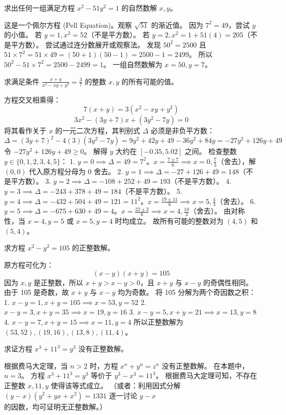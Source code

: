 \begin{questions}
\question 求出任何一组满足方程 $x^2 - 51y^2 = 1$ 的自然数解 $x, y$。
\begin{solution}
这是一个佩尔方程 (Pell Equation)。观察 $\sqrt{51}$ 的渐近值。
因为 $7^2 = 49$，尝试 $y$ 的小值。
若 $y = 1, x^2 = 52$（不是平方数）。
若 $y = 2, x^2 = 1 + 51(4) = 205$（不是平方数）。
尝试通过连分数展开或观察法。
发现 $50^2 = 2500$ 且 $51 \times 7^2 = 51 \times 49 = (50+1)(50-1) = 2500 - 1 = 2499$。
所以 $50^2 - 51 \times 7^2 = 2500 - 2499 = 1$。
一组自然数解为 $x = 50, y = 7$。
\end{solution}

\question 求满足条件 $\frac{x+y}{x^2-xy+y^2} = \frac{3}{7}$ 的整数 $x, y$ 的所有可能的值。
\begin{solution}
方程交叉相乘得：
\[7(x + y) = 3(x^2 - xy + y^2)\]
\[3x^2 - (3y + 7)x + (3y^2 - 7y) = 0\]
将其看作关于 $x$ 的一元二次方程，其判别式 $\Delta$ 必须是非负平方数：
\[\Delta = (3y + 7)^2 - 4(3)(3y^2 - 7y) = 9y^2 + 42y + 49 - 36y^2 + 84y = -27y^2 + 126y + 49\]
令 $-27y^2 + 126y + 49 \ge 0$。
解得 $y$ 大约在 $[-0.35, 5.02]$ 之间。
检查整数 $y \in \{0, 1, 2, 3, 4, 5\}$：
1. $y = 0 \implies \Delta = 49 = 7^2$。$x = \frac{7 \pm 7}{6} \implies x = 0, \frac{7}{3}$（舍去），解 $(0, 0)$ 代入原方程分母为 0 舍去。
2. $y = 1 \implies \Delta = -27 + 126 + 49 = 148$（不是平方数）。
3. $y = 2 \implies \Delta = -108 + 252 + 49 = 193$（不是平方数）。
4. $y = 3 \implies \Delta = -243 + 378 + 49 = 184$（不是平方数）。
5. $y = 4 \implies \Delta = -432 + 504 + 49 = 121 = 11^2$。$x = \frac{19 \pm 11}{6} \implies x = 5, \frac{4}{3}$（舍去）。
6. $y = 5 \implies \Delta = -675 + 630 + 49 = 4$。$x = \frac{22 \pm 2}{6} \implies x = 4, \frac{10}{3}$（舍去）。
由对称性，当 $x = 4, y = 5$ 或 $x = 5, y = 4$ 时均成立。
故所有可能的整数对为 $(4, 5)$ 和 $(5, 4)$。
\end{solution}

\question 求方程 $x^2 - y^2 = 105$ 的正整数解。
\begin{solution}
原方程可化为：
\[(x - y)(x + y) = 105\]
因为 $x, y$ 是正整数，所以 $x + y > x - y > 0$，且 $x + y$ 与 $x - y$ 的奇偶性相同。
由于 105 是奇数，故 $x + y$ 与 $x - y$ 均为奇数。
将 105 分解为两个奇因数之积：
1. $x - y = 1, x + y = 105 \implies x = 53, y = 52$
2. $x - y = 3, x + y = 35 \implies x = 19, y = 16$
3. $x - y = 5, x + y = 21 \implies x = 13, y = 8$
4. $x - y = 7, x + y = 15 \implies x = 11, y = 4$
所以正整数解为 $(53, 52), (19, 16), (13, 8), (11, 4)$。
\end{solution}

\question 求证方程 $x^3 + 11^3 = y^3$ 没有正整数解。
\begin{solution}
根据费马大定理，当 $n > 2$ 时，方程 $x^n + y^n = z^n$ 没有正整数解。
在本题中，$n = 3$。
方程 $x^3 + 11^3 = y^3$ 等价于 $y^3 - x^3 = 11^3$。
根据费马大定理可知，不存在正整数 $x, 11, y$ 使得该等式成立。
（或者：利用因式分解 $(y-x)(y^2+yx+x^2) = 1331$ 逐一讨论 $y-x$ 的因数，均可证明无正整数解。）
\end{solution}


\end{questions}
